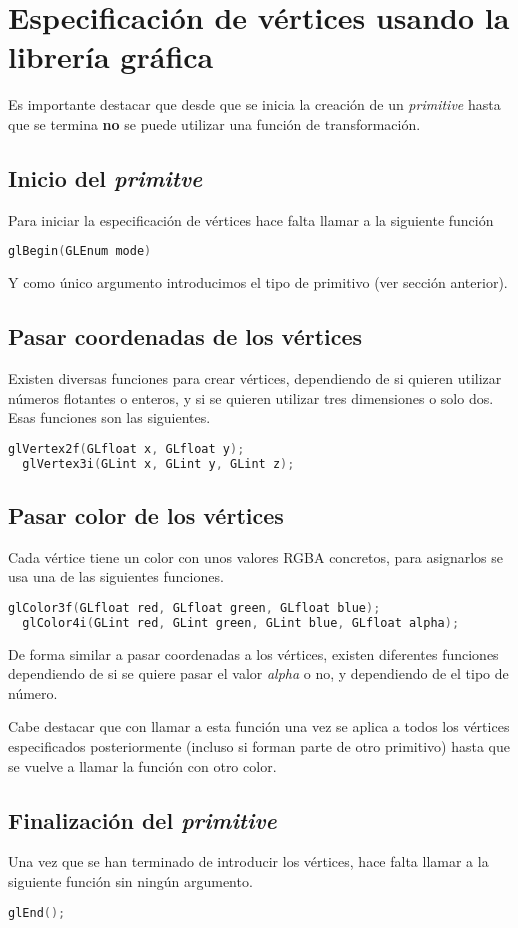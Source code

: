 \restoregeometry

\section{Especificación de vértices usando la librería gráfica}
Es importante destacar que desde que se inicia la creación de un \textit{primitive} hasta que se termina \textbf{no} se puede utilizar una función de transformación.

\subsection{Inicio del \textit{primitve}}
Para iniciar la especificación de vértices hace falta llamar a la siguiente función
\begin{lstlisting}[language=C]
  glBegin(GLEnum mode)
\end{lstlisting}
Y como único argumento introducimos el tipo de primitivo (ver sección anterior).

\subsection{Pasar coordenadas de los vértices}
Existen diversas funciones para crear vértices, dependiendo de si quieren utilizar números flotantes o enteros, y si se quieren utilizar tres dimensiones o solo dos. Esas funciones son las siguientes.
\begin{lstlisting}[language=C]
  glVertex2f(GLfloat x, GLfloat y);
  glVertex3i(GLint x, GLint y, GLint z);
\end{lstlisting}

\subsection{Pasar color de los vértices}
Cada vértice tiene un color con unos valores RGBA concretos, para asignarlos se usa una de las siguientes funciones.
\begin{lstlisting}[language=C]
  glColor3f(GLfloat red, GLfloat green, GLfloat blue);
  glColor4i(GLint red, GLint green, GLint blue, GLfloat alpha);
\end{lstlisting}
De forma similar a pasar coordenadas a los vértices, existen diferentes funciones dependiendo de si se quiere pasar el valor \textit{alpha} o no, y dependiendo de el tipo de número.

Cabe destacar que con llamar a esta función una vez se aplica a todos los vértices especificados posteriormente (incluso si forman parte de otro primitivo) hasta que se vuelve a llamar la función con otro color.
\subsection{Finalización del \textit{primitive}}
Una vez que se han terminado de introducir los vértices, hace falta llamar a la siguiente función sin ningún argumento.
\begin{lstlisting}[language=C]
  glEnd();
\end{lstlisting}
